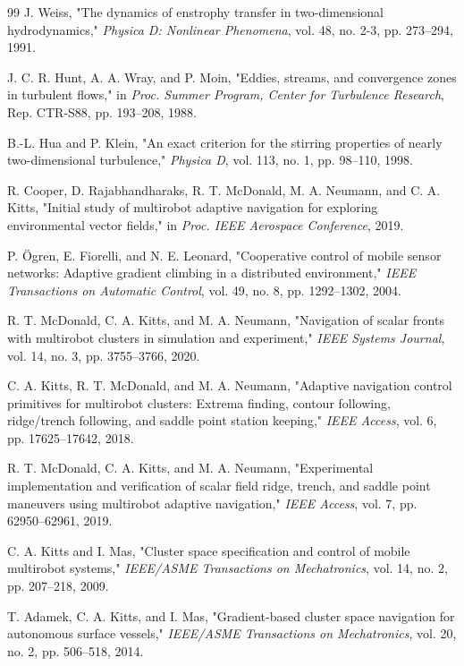 \documentclass[lettersize,journal]{IEEEtran}
\begin{document}
\begin{thebibliography}{99}
 J. Weiss, "The dynamics of enstrophy transfer in two-dimensional
hydrodynamics," \textit{Physica D: Nonlinear Phenomena}, vol. 48, no. 2-3,
pp. 273--294, 1991.

 J. C. R. Hunt, A. A. Wray, and P. Moin, "Eddies, streams, and
convergence zones in turbulent flows," in \textit{Proc. Summer Program,
Center for Turbulence Research}, Rep. CTR-S88, pp. 193--208, 1988.

 B.-L. Hua and P. Klein, "An exact criterion for the stirring
properties of nearly two-dimensional turbulence," \textit{Physica D}, vol. 113,
no. 1, pp. 98--110, 1998.

 R. Cooper, D. Rajabhandharaks, R. T. McDonald, M. A. Neumann,
and C. A. Kitts, "Initial study of multirobot adaptive
navigation for exploring environmental vector fields," in \textit{Proc.
IEEE Aerospace Conference}, 2019.

 P. Ögren, E. Fiorelli, and N. E. Leonard, "Cooperative control
of mobile sensor networks: Adaptive gradient climbing in a distributed
environment," \textit{IEEE Transactions on Automatic Control}, vol. 49, no. 8,
pp. 1292--1302, 2004.

 R. T. McDonald, C. A. Kitts, and M. A. Neumann, "Navigation of
scalar fronts with multirobot clusters in simulation and experiment,"
\textit{IEEE Systems Journal}, vol. 14, no. 3, pp. 3755--3766, 2020.

 C. A. Kitts, R. T. McDonald, and M. A. Neumann, "Adaptive
navigation control primitives for multirobot clusters: Extrema finding,
contour following, ridge/trench following, and saddle point station keeping,"
\textit{IEEE Access}, vol. 6, pp. 17625--17642, 2018.

 R. T. McDonald, C. A. Kitts, and M. A. Neumann, "Experimental
implementation and verification of scalar field ridge, trench, and saddle
point maneuvers using multirobot adaptive navigation," \textit{IEEE Access},
vol. 7, pp. 62950--62961, 2019.

 C. A. Kitts and I. Mas, "Cluster space specification and control
of mobile multirobot systems," \textit{IEEE/ASME Transactions on Mechatronics},
vol. 14, no. 2, pp. 207--218, 2009.

 T. Adamek, C. A. Kitts, and I. Mas, "Gradient-based cluster space
navigation for autonomous surface vessels," \textit{IEEE/ASME Transactions on
Mechatronics}, vol. 20, no. 2, pp. 506--518, 2014.


\end{thebibliography}
\end{document}
